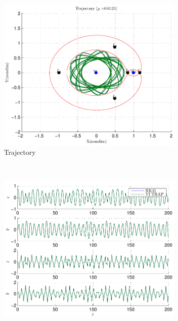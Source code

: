 \begin{figure} 
	\centering 
	\begin{subfigure}[h]{0.3\textwidth} 
		\includegraphics[width=\textwidth]{figures/2015_AAS/integrator_compare/trajectory} 
		\caption{Trajectory} \label{fig:compare_trajectory} 
	\end{subfigure}~ %
	\begin{subfigure}[htbp]{0.3\textwidth} 
		\includegraphics[width=\textwidth]{figures/2015_AAS/integrator_compare/components} 

\end{subfigure}
\end{figure}
